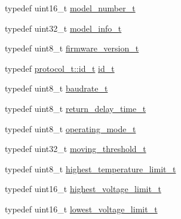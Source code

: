 \begin{DoxyCompactItemize}
\item 
typedef uint16\+\_\+t \hyperlink{structdynamixel_1_1servos_1_1_model_traits_3_01_pro_l4210_s300_01_4_1_1_c_t_a67b21a46f251b319489957b518a50ccb}{model\+\_\+number\+\_\+t}
\item 
typedef uint32\+\_\+t \hyperlink{structdynamixel_1_1servos_1_1_model_traits_3_01_pro_l4210_s300_01_4_1_1_c_t_a1abb97a8c1cf603dbb870c3784a9430b}{model\+\_\+info\+\_\+t}
\item 
typedef uint8\+\_\+t \hyperlink{structdynamixel_1_1servos_1_1_model_traits_3_01_pro_l4210_s300_01_4_1_1_c_t_afde63bdf6ecfc3b6876a2088e6fb0d67}{firmware\+\_\+version\+\_\+t}
\item 
typedef \hyperlink{classdynamixel_1_1protocols_1_1_protocol2_a38d9cae72cd86213cca74e718c240429}{protocol\+\_\+t\+::id\+\_\+t} \hyperlink{structdynamixel_1_1servos_1_1_model_traits_3_01_pro_l4210_s300_01_4_1_1_c_t_a93ba6f95c977685edc75f5e043efde56}{id\+\_\+t}
\item 
typedef uint8\+\_\+t \hyperlink{structdynamixel_1_1servos_1_1_model_traits_3_01_pro_l4210_s300_01_4_1_1_c_t_ac160ecb025beab146ed9051ea7c1f0cd}{baudrate\+\_\+t}
\item 
typedef uint8\+\_\+t \hyperlink{structdynamixel_1_1servos_1_1_model_traits_3_01_pro_l4210_s300_01_4_1_1_c_t_ae509b7ec14e21daddab5ebccb6138cd1}{return\+\_\+delay\+\_\+time\+\_\+t}
\item 
typedef uint8\+\_\+t \hyperlink{structdynamixel_1_1servos_1_1_model_traits_3_01_pro_l4210_s300_01_4_1_1_c_t_a43c41e2e5b60efb5a04564811c7571cb}{operating\+\_\+mode\+\_\+t}
\item 
typedef uint32\+\_\+t \hyperlink{structdynamixel_1_1servos_1_1_model_traits_3_01_pro_l4210_s300_01_4_1_1_c_t_ad9519beacd602a472132aa0c4d1b6541}{moving\+\_\+threshold\+\_\+t}
\item 
typedef uint8\+\_\+t \hyperlink{structdynamixel_1_1servos_1_1_model_traits_3_01_pro_l4210_s300_01_4_1_1_c_t_a6cec9da8f03c0b6db50dce201f9342a1}{highest\+\_\+temperature\+\_\+limit\+\_\+t}
\item 
typedef uint16\+\_\+t \hyperlink{structdynamixel_1_1servos_1_1_model_traits_3_01_pro_l4210_s300_01_4_1_1_c_t_a414748a92d6b1a66403369416f211bec}{highest\+\_\+voltage\+\_\+limit\+\_\+t}
\item 
typedef uint16\+\_\+t \hyperlink{structdynamixel_1_1servos_1_1_model_traits_3_01_pro_l4210_s300_01_4_1_1_c_t_adf87e6a67bec580e9038b8f216769738}{lowest\+\_\+voltage\+\_\+limit\+\_\+t}
\item 

\end{DoxyCompactItemize}
